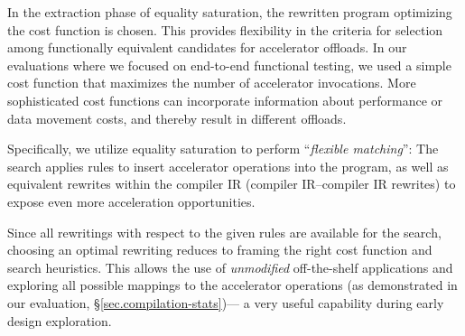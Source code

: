 In the extraction phase of equality saturation, the rewritten program optimizing the cost function is chosen. %
This provides flexibility in the criteria for selection among functionally equivalent candidates for accelerator offloads. In our evaluations where we focused on end-to-end functional testing, we used a simple cost function that maximizes the number of accelerator invocations. More sophisticated cost functions can incorporate information about performance or data movement costs, and thereby result in different offloads.

\iffalse
Specifically, we utilize equality saturation
  to perform ``\textit{flexible matching}'':
  The search applies \mapping rules %
  to insert accelerator operations into the program,
  as well as equivalent rewrites within the compiler IR (compiler IR--compiler IR rewrites)
  to expose even more acceleration opportunities. %
  \iffalse
Equality saturation avoids
  phase-ordering issues when applying rewrites
  by searching over many equivalent rewritings of the same program,
  including different choices of accelerator operations,
  which ultimately reduces the need for manual program restructuring
  and improves application portability.
Given an input program $p$, 
  equality saturation repeatedly applies 
  the given rewrite rules 
  to explore all equivalent ways to express $p$
  (with respect to the rewrite rules).
This is accomplished using an \textit{e-graph} data structure
  to efficiently represent an exponentially large set of equivalent program expressions~\cite{nelson1980fast,nieuwenhuis2005proof}.
Upon reaching a fixed point, 
  i.e., when no application of any rewrite rule can introduce a new program expression, 
  the optimal rewritten program
  can be extracted from an e-graph
  according to a given cost function,
  thus providing for searching over many candidate rewritings without sophisticated ordering considerations.
\fi
Since all rewritings with respect to the given rules 
  are available for the search,
  choosing an optimal rewriting
  reduces to framing the right cost function and search heuristics.
This allows %
the use of \textit{unmodified} off-the-shelf applications
  and exploring all possible mappings to the accelerator operations (as demonstrated in our evaluation, \S\ref{sec.compilation-stats})---%
  a very useful capability during early design exploration. 
  
